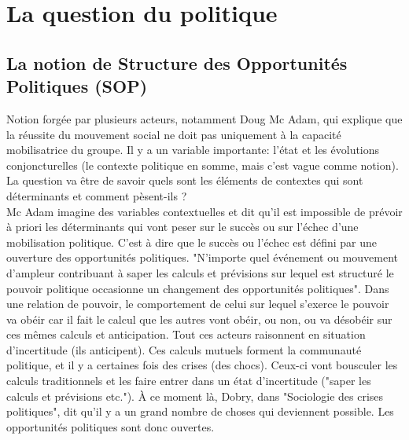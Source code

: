 \documentclass[10pt, a4paper, openany]{book}
\begin{document}
\chapter{La question du politique}

\section{La notion de Structure des Opportunités Politiques (SOP)}

Notion forgée par plusieurs acteurs, notamment Doug Mc Adam, qui explique que la réussite du mouvement social ne doit pas uniquement à la capacité mobilisatrice du groupe. Il y a un variable importante: l'état et les évolutions conjoncturelles (le contexte politique en somme, mais c'est vague comme notion). La question va être de savoir quels sont les éléments de contextes qui sont déterminants et comment pèsent-ils ? \\
Mc Adam imagine des variables contextuelles et dit qu'il est impossible de prévoir à priori les déterminants qui vont peser sur le succès ou sur l'échec d'une mobilisation politique. C'est à dire que le succès ou l'échec est défini par une ouverture des opportunités politiques. "N'importe quel événement ou mouvement d'ampleur contribuant à saper les calculs et prévisions sur lequel est structuré le pouvoir politique occasionne un changement des opportunités politiques". Dans une relation de pouvoir, le comportement de celui sur lequel s'exerce le pouvoir va obéir car il fait le calcul que les autres vont obéir, ou non, ou va désobéir sur ces mêmes calculs et anticipation. Tout ces acteurs raisonnent en situation d'incertitude (ils anticipent). Ces calculs mutuels forment la communauté politique, et il y a certaines fois des crises (des chocs). Ceux-ci vont bousculer les calculs traditionnels et les faire entrer dans un état d'incertitude ("saper les calculs et prévisions etc."). À ce moment là, Dobry, dans "Sociologie des crises politiques", dit qu'il y a un grand nombre de choses qui deviennent possible. Les opportunités politiques sont donc ouvertes.
\end{document}
